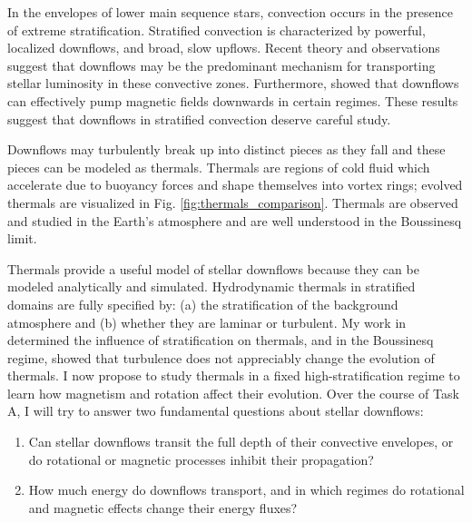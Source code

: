 \documentclass[11pt, preprint]{aastex}
\begin{document}
In the envelopes of lower main sequence stars, convection occurs in the presence of extreme stratification.
Stratified convection is characterized by powerful, localized downflows, and broad, slow upflows.
Recent theory and observations \citep[e.g.,][]{hanasoge&all2015, brandenburg2016, kapyla&all2017, andersLB2019} suggest that downflows may be the predominant mechanism for transporting stellar luminosity in these convective zones.
Furthermore, \citet{tobias&all1998} showed that downflows can effectively pump magnetic fields downwards in certain regimes.
These results suggest that downflows in stratified convection deserve careful study.

Downflows may turbulently break up into distinct pieces as they fall and these pieces can be modeled as thermals.
Thermals are regions of cold fluid which accelerate due to buoyancy forces and shape themselves into vortex rings; evolved thermals are visualized in Fig. \ref{fig:thermals_comparison}.
Thermals are observed and studied in the Earth's atmosphere and are well understood in the Boussinesq limit.

Thermals provide a useful model of stellar downflows because they can be modeled analytically and simulated.
Hydrodynamic thermals in stratified domains are fully specified by: (a) the stratification of the background atmosphere and (b) whether they are laminar or turbulent.
My work in \citet{andersLB2019} determined the influence of stratification on thermals, and in the Boussinesq regime, \citet{lecoanet&jeevanjee2019} showed that turbulence does not appreciably change the evolution of thermals.
I now propose to study thermals in a fixed high-stratification regime to learn how magnetism and rotation affect their evolution.
Over the course of Task A, I will try to answer two fundamental questions about stellar downflows:
\vspace{-16pt}
\begin{enumerate}
\item Can stellar downflows transit the full depth of their convective envelopes, or do rotational or magnetic processes inhibit their propagation?
\vspace{-10pt}
\item How much energy do downflows transport, and in which regimes do rotational and magnetic effects change their energy fluxes?
\end{enumerate}
\end{document}
